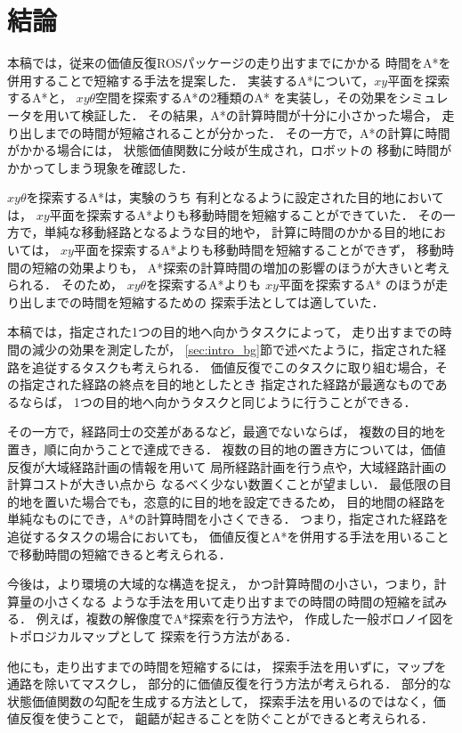 \chapter{結論}\label{chap:conclusion}

本稿では，従来の価値反復ROSパッケージの走り出すまでにかかる
時間をA*を併用することで短縮する手法を提案した．
実装するA*について，$xy$平面を探索するA*と，
$xy\theta$空間を探索するA*の2種類のA*
を実装し，その効果をシミュレータを用いて検証した．
その結果，A*の計算時間が十分に小さかった場合，
走り出しまでの時間が短縮されることが分かった．
その一方で，A*の計算に時間がかかる場合には，
状態価値関数に分岐が生成され，ロボットの
移動に時間がかかってしまう現象を確認した．

$xy\theta$を探索するA*は，実験のうち
有利となるように設定された目的地においては，
$xy$平面を探索するA*よりも移動時間を短縮することができていた．
その一方で，単純な移動経路となるような目的地や，
計算に時間のかかる目的地においては，
$xy$平面を探索するA*よりも移動時間を短縮することができず，
移動時間の短縮の効果よりも，
A*探索の計算時間の増加の影響のほうが大きいと考えられる．
そのため，
$xy\theta$を探索するA*よりも
$xy$平面を探索するA*
のほうが走り出しまでの時間を短縮するための
探索手法としては適していた．

本稿では，指定された1つの目的地へ向かうタスクによって，
走り出すまでの時間の減少の効果を測定したが，
\ref{sec:intro_bg}節で述べたように，指定された経路を追従するタスクも考えられる．
価値反復でこのタスクに取り組む場合，その指定された経路の終点を目的地としたとき
指定された経路が最適なものであるならば，
1つの目的地へ向かうタスクと同じように行うことができる．

その一方で，経路同士の交差があるなど，最適でないならば，
複数の目的地を置き，順に向かうことで達成できる．
複数の目的地の置き方については，価値反復が大域経路計画の情報を用いて
局所経路計画を行う点や，大域経路計画の計算コストが大きい点から
なるべく少ない数置くことが望ましい．
最低限の目的地を置いた場合でも，恣意的に目的地を設定できるため，
目的地間の経路を単純なものにでき，A*の計算時間を小さくできる．
つまり，指定された経路を追従するタスクの場合においても，
価値反復とA*を併用する手法を用いることで移動時間の短縮できると考えられる．

今後は，より環境の大域的な構造を捉え，
かつ計算時間の小さい，つまり，計算量の小さくなる
ような手法を用いて走り出すまでの時間の時間の短縮を試みる．
例えば，複数の解像度でA*探索を行う方法や，
作成した一般ボロノイ図をトポロジカルマップとして
探索を行う方法がある．

他にも，走り出すまでの時間を短縮するには，
探索手法を用いずに，マップを通路を除いてマスクし，
部分的に価値反復を行う方法が考えられる．
部分的な状態価値関数の勾配を生成する方法として，
探索手法を用いるのではなく，価値反復を使うことで，
齟齬が起きることを防ぐことができると考えられる．
